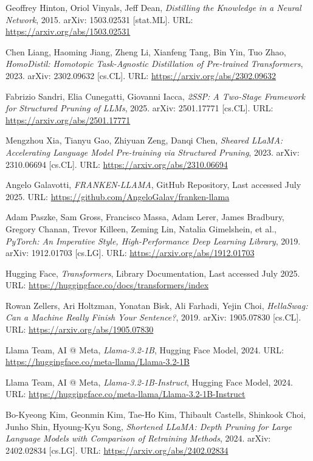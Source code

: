 \begin{thebibliography}{9}
	Geoffrey Hinton, Oriol Vinyals, Jeff Dean,
	\textit{Distilling the Knowledge in a Neural Network},
	2015. arXiv: 1503.02531 [stat.ML]. URL: \url{https://arxiv.org/abs/1503.02531}
	
	Chen Liang, Haoming Jiang, Zheng Li, Xianfeng Tang, Bin Yin, Tuo Zhao,
	\textit{HomoDistil: Homotopic Task-Agnostic Distillation of Pre-trained Transformers},
	2023. arXiv: 2302.09632 [cs.CL]. URL: \url{https://arxiv.org/abs/2302.09632}

	Fabrizio Sandri, Elia Cunegatti, Giovanni Iacca,
	\textit{2SSP: A Two-Stage Framework for Structured Pruning of LLMs},
	2025. arXiv: 2501.17771 [cs.CL]. URL: \url{https://arxiv.org/abs/2501.17771}

	Mengzhou Xia, Tianyu Gao, Zhiyuan Zeng, Danqi Chen,
	\textit{Sheared LLaMA: Accelerating Language Model Pre-training via Structured Pruning},
	2023. arXiv: 2310.06694 [cs.CL]. URL: \url{https://arxiv.org/abs/2310.06694}

	Angelo Galavotti,
	\textit{FRANKEN-LLAMA}, GitHub Repository, Last accessed July 2025. URL:
	\url{https://github.com/AngeloGalav/franken-llama}

	Adam Paszke, Sam Gross, Francisco Massa, Adam Lerer, James Bradbury, Gregory Chanan, Trevor Killeen, Zeming Lin, Natalia Gimelshein, et al.,
	\textit{PyTorch: An Imperative Style, High-Performance Deep Learning Library},
	2019. arXiv: 1912.01703 [cs.LG]. URL: \url{https://arxiv.org/abs/1912.01703}

	Hugging Face,
	\textit{Transformers}, Library Documentation, Last accessed July 2025. URL:
	\url{https://huggingface.co/docs/transformers/index}

	Rowan Zellers, Ari Holtzman, Yonatan Bisk, Ali Farhadi, Yejin Choi,
	\textit{HellaSwag: Can a Machine Really Finish Your Sentence?},
	2019. arXiv: 1905.07830 [cs.CL]. URL: \url{https://arxiv.org/abs/1905.07830}

	Llama Team, AI @ Meta,
	\textit{Llama-3.2-1B},
	Hugging Face Model, 2024. URL: \url{https://huggingface.co/meta-llama/Llama-3.2-1B}

	Llama Team, AI @ Meta,
	\textit{Llama-3.2-1B-Instruct}, Hugging Face Model, 2024. URL:
	\url{https://huggingface.co/meta-llama/Llama-3.2-1B-Instruct}

	Bo-Kyeong Kim, Geonmin Kim, Tae-Ho Kim, Thibault Castells, Shinkook Choi, Junho Shin, Hyoung-Kyu Song,
	\textit{Shortened LLaMA: Depth Pruning for Large Language Models with Comparison of Retraining Methods},
	2024. arXiv: 2402.02834 [cs.LG]. URL: \url{https://arxiv.org/abs/2402.02834}


\end{thebibliography}
